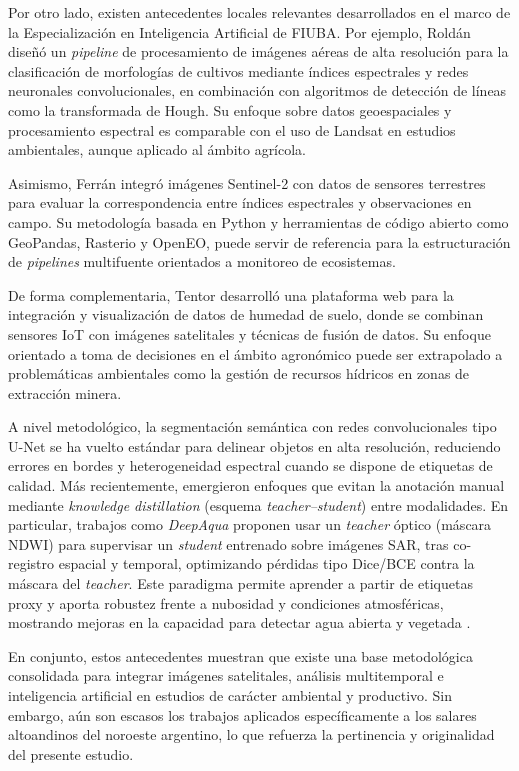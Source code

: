 Por otro lado, existen antecedentes locales relevantes desarrollados en el marco de la Especialización en Inteligencia Artificial de FIUBA. Por ejemplo, Roldán \cite{roldan2023ceia} diseñó un \textit{pipeline} de procesamiento de imágenes aéreas de alta resolución para la clasificación de morfologías de cultivos mediante índices espectrales y redes neuronales convolucionales, en combinación con algoritmos de detección de líneas como la transformada de Hough. Su enfoque sobre datos geoespaciales y procesamiento espectral es comparable con el uso de Landsat en estudios ambientales, aunque aplicado al ámbito agrícola.

Asimismo, Ferrán \cite{ferran2024ceia} integró imágenes Sentinel-2 con datos de sensores terrestres para evaluar la correspondencia entre índices espectrales y observaciones en campo. Su metodología basada en Python y herramientas de código abierto como GeoPandas, Rasterio y OpenEO, puede servir de referencia para la estructuración de \textit{pipelines} multifuente orientados a monitoreo de ecosistemas.

De forma complementaria, Tentor \cite{tentor2023ceiot} desarrolló una plataforma web para la integración y visualización de datos de humedad de suelo, donde se combinan sensores IoT con imágenes satelitales y técnicas de fusión de datos. Su enfoque orientado a toma de decisiones en el ámbito agronómico puede ser extrapolado a problemáticas ambientales como la gestión de recursos hídricos en zonas de extracción minera.

A nivel metodológico, la segmentación semántica con redes convolucionales tipo U-Net se ha vuelto estándar para delinear objetos en alta resolución, reduciendo errores en bordes y heterogeneidad espectral cuando se dispone de etiquetas de calidad. Más recientemente, emergieron enfoques que evitan la anotación manual mediante \emph{knowledge distillation} (esquema \emph{teacher–student}) entre modalidades. En particular, trabajos como \emph{DeepAqua} proponen usar un \emph{teacher} óptico (máscara NDWI) para supervisar un \emph{student} entrenado sobre imágenes SAR, tras co-registro espacial y temporal, optimizando pérdidas tipo Dice/BCE contra la máscara del \emph{teacher}. Este paradigma permite aprender a partir de etiquetas proxy y aporta robustez frente a nubosidad y condiciones atmosféricas, mostrando mejoras en la capacidad para detectar agua abierta y vegetada \cite{DeepAqua2023}.


En conjunto, estos antecedentes muestran que existe una base metodológica consolidada para integrar imágenes satelitales, análisis multitemporal e inteligencia artificial en estudios de carácter ambiental y productivo. Sin embargo, aún son escasos los trabajos aplicados específicamente a los salares altoandinos del noroeste argentino, lo que refuerza la pertinencia y originalidad del presente estudio.


